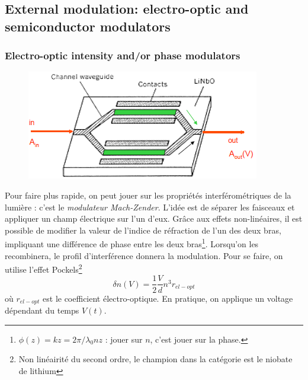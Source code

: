 \subsection{External modulation: electro-optic and semiconductor modulators}

\subsubsection{Electro-optic intensity and/or phase modulators}
\begin{figure}
	\vspace{-5mm}
	\includegraphics[scale=0.6]{ch4/image28}
	\end{figure}
Pour faire plus rapide, on peut jouer sur les propriétés interférométriques de la lumière : c'est
le \textit{modulateur Mach-Zender}. L'idée est de séparer les faisceaux et appliquer un champ
électrique sur l'un d'eux. Grâce aux effets non-linéaires, il est possible de modifier la valeur
de l'indice de réfraction de l'un des deux bras, impliquant une différence de phase entre les deux 
bras\footnote{$\phi(z) = kz = 2\pi/\lambda_0 nz$ : jouer sur $n$, c'est jouer sur la phase.}. 
Lorsqu'on les recombinera, le profil d'interférence donnera la modulation. Pour se faire, on 
utilise l'effet Pockels\footnote{Non linéairité du second ordre, le champion dans la catégorie est
le niobate de lithium}
\begin{equation}
\delta n\left( V \right) = \frac{1}{2}\frac{V}{d}{n^3}{r_{el - opt}}
\end{equation}
où $r_{el-opt}$ est le coefficient électro-optique. En pratique, on applique un voltage dépendant du
 temps $V(t)$.\\
 
